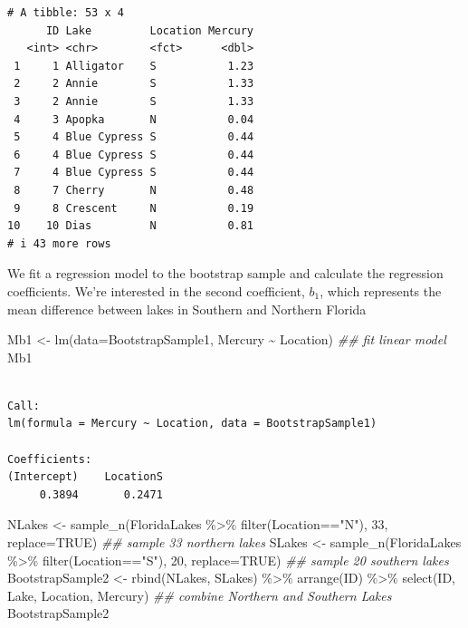 \documentclass[
  letterpaper,
  DIV=11,
  numbers=noendperiod]{scrreprt}
\newenvironment{Shaded}{\begin{snugshade}}{\end{snugshade}}
\newcommand{\AttributeTok}[1]{\textcolor[rgb]{0.40,0.45,0.13}{#1}}
\newcommand{\ConstantTok}[1]{\textcolor[rgb]{0.56,0.35,0.01}{#1}}
\newcommand{\DecValTok}[1]{\textcolor[rgb]{0.68,0.00,0.00}{#1}}
\newcommand{\DocumentationTok}[1]{\textcolor[rgb]{0.37,0.37,0.37}{\textit{#1}}}
\newcommand{\FunctionTok}[1]{\textcolor[rgb]{0.28,0.35,0.67}{#1}}
\newcommand{\NormalTok}[1]{\textcolor[rgb]{0.00,0.23,0.31}{#1}}
\newcommand{\OtherTok}[1]{\textcolor[rgb]{0.00,0.23,0.31}{#1}}
\newcommand{\SpecialCharTok}[1]{\textcolor[rgb]{0.37,0.37,0.37}{#1}}
\newcommand{\StringTok}[1]{\textcolor[rgb]{0.13,0.47,0.30}{#1}}
\begin{document}
\begin{verbatim}
# A tibble: 53 x 4
      ID Lake         Location Mercury
   <int> <chr>        <fct>      <dbl>
 1     1 Alligator    S           1.23
 2     2 Annie        S           1.33
 3     2 Annie        S           1.33
 4     3 Apopka       N           0.04
 5     4 Blue Cypress S           0.44
 6     4 Blue Cypress S           0.44
 7     4 Blue Cypress S           0.44
 8     7 Cherry       N           0.48
 9     8 Crescent     N           0.19
10    10 Dias         N           0.81
# i 43 more rows
\end{verbatim}

We fit a regression model to the bootstrap sample and calculate the
regression coefficients. We're interested in the second coefficient,
\(b_1\), which represents the mean difference between lakes in Southern
and Northern Florida

\begin{Shaded}
\begin{Highlighting}[]
\NormalTok{Mb1 }\OtherTok{\textless{}{-}} \FunctionTok{lm}\NormalTok{(}\AttributeTok{data=}\NormalTok{BootstrapSample1, Mercury }\SpecialCharTok{\textasciitilde{}}\NormalTok{ Location) }\DocumentationTok{\#\# fit linear model}
\NormalTok{Mb1}
\end{Highlighting}
\end{Shaded}

\begin{verbatim}

Call:
lm(formula = Mercury ~ Location, data = BootstrapSample1)

Coefficients:
(Intercept)    LocationS  
     0.3894       0.2471  
\end{verbatim}

\begin{Shaded}
\begin{Highlighting}[]
\NormalTok{NLakes }\OtherTok{\textless{}{-}} \FunctionTok{sample\_n}\NormalTok{(FloridaLakes }\SpecialCharTok{\%\textgreater{}\%} \FunctionTok{filter}\NormalTok{(Location}\SpecialCharTok{==}\StringTok{"N"}\NormalTok{), }\DecValTok{33}\NormalTok{, }\AttributeTok{replace=}\ConstantTok{TRUE}\NormalTok{)   }\DocumentationTok{\#\# sample 33 northern lakes}
\NormalTok{SLakes }\OtherTok{\textless{}{-}} \FunctionTok{sample\_n}\NormalTok{(FloridaLakes }\SpecialCharTok{\%\textgreater{}\%} \FunctionTok{filter}\NormalTok{(Location}\SpecialCharTok{==}\StringTok{"S"}\NormalTok{), }\DecValTok{20}\NormalTok{, }\AttributeTok{replace=}\ConstantTok{TRUE}\NormalTok{)   }\DocumentationTok{\#\# sample 20 southern lakes}
\NormalTok{BootstrapSample2 }\OtherTok{\textless{}{-}} \FunctionTok{rbind}\NormalTok{(NLakes, SLakes) }\SpecialCharTok{\%\textgreater{}\%} \FunctionTok{arrange}\NormalTok{(ID) }\SpecialCharTok{\%\textgreater{}\%} 
  \FunctionTok{select}\NormalTok{(ID, Lake, Location, Mercury)   }\DocumentationTok{\#\# combine Northern and Southern Lakes}
\NormalTok{BootstrapSample2}
\end{Highlighting}
\end{Shaded}
\end{document}
